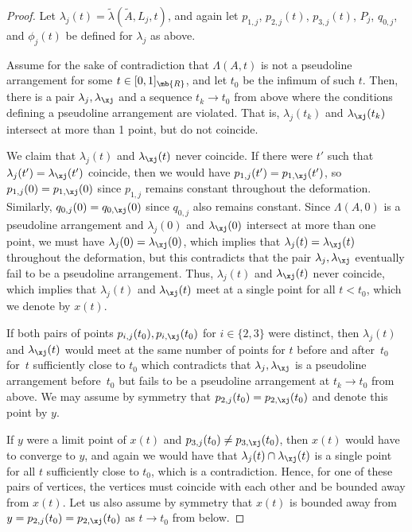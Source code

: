 \begin{proof}
Let $\lambda_j(t)=\tilde \lambda(\tilde A, L_j,t)$, and again let $p_{1,j}$, $p_{2,j}(t)$, $p_{3,j}(t)$, $P_j$, $q_{0,j}$, and $\phi_j(t)$ be defined for $\lambda_j$ as above.

Assume for the sake of contradiction that $\Lambda(A,t)$ is not a pseudoline arrangement for some $t\in [0,1]_\mb{R}$, and let $t_0$ be the infimum of such $t$.
Then, there is a pair $\lambda_j,\lambda_\xj$ and a sequence $t_k \to t_0$ from above where the conditions defining a pseudoline arrangement are violated.
That is, $\lambda_j(t_k)$ and $\lambda_\xj(t_k)$ intersect at more than 1 point, but do not coincide.

We claim that $\lambda_j(t)$ and $\lambda_\xj(t)$ never coincide. If there were $t'$ such that $\lambda_j(t')=\lambda_\xj(t')$ coincide, then we would have $p_{1,j}(t') = p_{1,\xj}(t')$, so $p_{1,j}(0) = p_{1,\xj}(0)$ since $p_{1,j}$ remains constant throughout the deformation.
Similarly, $q_{0,j}(0) = q_{0,\xj}(0)$ since $q_{0,j}$ also remains constant.
Since $\Lambda(A,0)$ is a pseudoline arrangement and $\lambda_j(0)$ and $\lambda_\xj(0)$ intersect at more than one point, we must have $\lambda_j(0) = \lambda_\xj(0)$, which implies that $\lambda_j(t) = \lambda_\xj(t)$ throughout the deformation, but this contradicts that the pair $\lambda_j,\lambda_\xj$ eventually fail to be a pseudoline arrangement.
Thus, $\lambda_j(t)$ and $\lambda_\xj(t)$ never coincide,
which implies that $\lambda_j(t)$ and $\lambda_\xj(t)$ meet at a single point for all $t<t_0$, which we denote by $x(t)$.

If both pairs of points $p_{i,j}(t_0),p_{i,\xj}(t_0)$ for $i \in \{2,3\}$ were distinct, then $\lambda_j(t)$ and $\lambda_\xj(t)$ would meet at the same number of points for $t$ before and after~$t_0$ for~$t$ sufficiently close to $t_0$ which contradicts that $\lambda_j,\lambda_\xj$ is a pseudoline arrangement before~$t_0$ but fails to be a pseudoline arrangement at $t_k \to t_0$ from above.
We may assume by symmetry that $p_{2,j}(t_0) = p_{2,\xj}(t_0)$ and denote this point by $y$.

If $y$ were a limit point of $x(t)$
and $p_{3,j}(t_0) \neq p_{3,\xj}(t_0)$, then $x(t)$ would have to converge to $y$, and again we would have that $\lambda_j(t)\cap \lambda_\xj(t)$ is a single point for all $t$ sufficiently close to $t_0$, which is a contradiction. Hence, for one of these pairs of vertices, the vertices must coincide with each other and be bounded away from $x(t)$.
Let us also assume by symmetry that $x(t)$ is bounded away from $y = p_{2,j}(t_0) = p_{2,\xj}(t_0)$ as $t \to t_0$ from below.


\end{proof}
